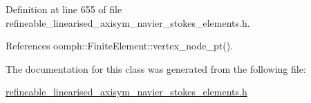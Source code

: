 Definition at line 655 of file refineable\+\_\+linearised\+\_\+axisym\+\_\+navier\+\_\+stokes\+\_\+elements.\+h.



References oomph\+::\+Finite\+Element\+::vertex\+\_\+node\+\_\+pt().



The documentation for this class was generated from the following file\+:\begin{DoxyCompactItemize}
\item 
\hyperlink{refineable__linearised__axisym__navier__stokes__elements_8h}{refineable\+\_\+linearised\+\_\+axisym\+\_\+navier\+\_\+stokes\+\_\+elements.\+h}\end{DoxyCompactItemize}
